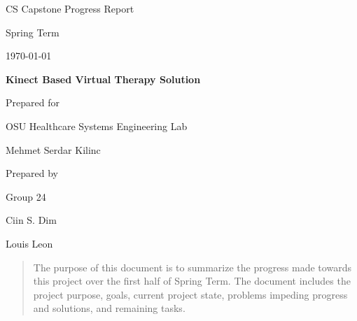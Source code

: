 \documentclass[onecolumn, draftclsnofoot,10pt, compsoc]{IEEEtran}
\def \CapstoneTeamName{     TeamName}
\def \CapstoneTeamNumber{       24}
\def \GroupMemberOne{            Ciin S. Dim}
\def \GroupMemberTwo{           Louis Leon}
\def \CapstoneProjectName{      Kinect Based Virtual Therapy Solution}
\def \CapstoneSponsorCompany{   OSU Healthcare Systems Engineering Lab}
\def \CapstoneSponsorPerson{        Mehmet Serdar Kilinc}
\def \DocType{      %
                Progress Report
                }
\newcommand{\NameSigPair}[1]{\par
\makebox[2.75in][r]{#1} \hfil   \makebox[3.25in]{\makebox[2.25in]{\hrulefill} \hfill        \makebox[.75in]{\hrulefill}}
\par\vspace{-12pt} \textit{\tiny\noindent
\makebox[2.75in]{} \hfil        \makebox[3.25in]{\makebox[2.25in][r]{Signature} \hfill  \makebox[.75in][r]{Date}}}}
\renewcommand{\NameSigPair}[1]{#1}
\begin{document}
\begin{titlepage}
    \begin{singlespace}
        \hfill 
        \par\vspace{.2in}
        \centering
        \scshape{
            \huge CS Capstone\DocType \par
            {\large Spring Term}\par
            {\large\today}\par
            \vspace{.5in}
            \textbf{\Huge\CapstoneProjectName}\par
            \vfill
            {\large Prepared for}\par
            \Huge \CapstoneSponsorCompany\par
            \vspace{5pt}
            {\Large\NameSigPair{\CapstoneSponsorPerson}\par}
            {\large Prepared by }\par
            Group\CapstoneTeamNumber\par
            \vspace{5pt}
            {\Large
                \NameSigPair{\GroupMemberOne}\par
                \NameSigPair{\GroupMemberTwo}\par
            }
            \vspace{20pt}
        }
        \begin{abstract}
        The purpose of this document is to summarize the progress made towards this project over the first half of Spring Term. The document includes the project purpose, goals, current project state, problems impeding progress and solutions, and remaining tasks.
    \end{abstract}     
    \end{singlespace}
\end{titlepage}
\newpage
{}
\tableofcontents
\listoffigures
\clearpage
\end{document}
